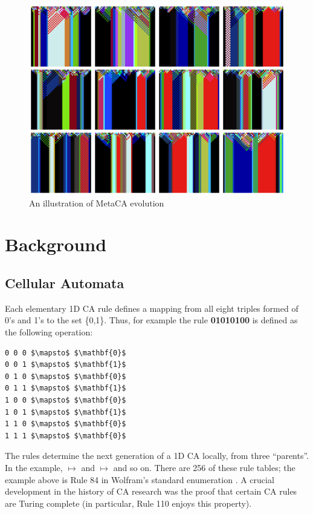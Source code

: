 \documentclass{AISB2008}
\makeatletter
\renewcommand{\boxed}[1]{\text{\fboxsep=.2em\fbox{\m@th$\displaystyle#1$}}}
\newcommand{\mystrut}{\vphantom{b\gamma}}
\makeatother
\begin{document}
\begin{figure}
\includegraphics[width=\columnwidth]{metaca2.png}
\caption{An illustration of MetaCA evolution\label{metaca-taster}}
\end{figure}

\newpage

\section{Background}

\subsection{Cellular Automata}

Each elementary 1D CA rule defines a mapping from all eight triples formed of
0's and 1's to the set \{0,1\}.  Thus, for example the rule \textbf{01010100}
is defined as the following operation:
\begin{lstlisting}[mathescape]
0 0 0 $\mapsto$ $\mathbf{0}$
0 0 1 $\mapsto$ $\mathbf{1}$
0 1 0 $\mapsto$ $\mathbf{0}$
0 1 1 $\mapsto$ $\mathbf{1}$
1 0 0 $\mapsto$ $\mathbf{0}$
1 0 1 $\mapsto$ $\mathbf{1}$
1 1 0 $\mapsto$ $\mathbf{0}$
1 1 1 $\mapsto$ $\mathbf{0}$
\end{lstlisting}

The rules determine the next generation of a 1D CA locally, from three ``parents''.  In the example,
\boxed{0\mystrut}\boxed{0\mystrut}\boxed{0\mystrut} $\mapsto$
\boxed{0\mystrut} and
\boxed{0\mystrut}\boxed{0\mystrut}\boxed{1\mystrut} $\mapsto$
\boxed{1\mystrut} and so on.
There are 256 of these rule tables; the example above is Rule 84 in
Wolfram's standard enumeration \cite{wolfram1994cellular}.
A crucial development in the history of CA research was the proof
\cite{cook2004universality} that certain CA rules are Turing complete
(in particular, Rule 110 enjoys this
property).
\end{document}
